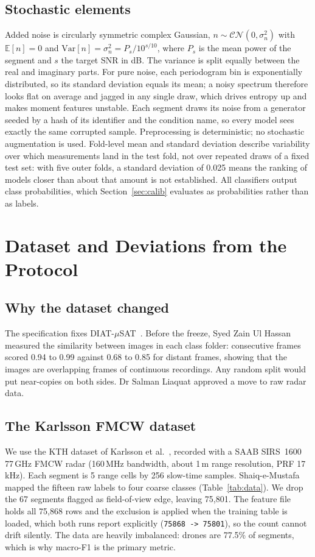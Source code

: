 \documentclass[conference]{IEEEtran}
\begin{document}
\subsection{Stochastic elements}
\label{sec:stoch}
Added noise is circularly symmetric complex Gaussian, $n \sim \mathcal{CN}(0,\sigma_n^2)$ with $\mathbb{E}[n]=0$ and $\mathrm{Var}[n]=\sigma_n^2 = P_s/10^{s/10}$, where $P_s$ is the mean power of the segment and $s$ the target SNR in dB. The variance is split equally between the real and imaginary parts. For pure noise, each periodogram bin is exponentially distributed, so its standard deviation equals its mean; a noisy spectrum therefore looks flat on average and jagged in any single draw, which drives entropy up and makes moment features unstable. Each segment draws its noise from a generator seeded by a hash of its identifier and the condition name, so every model sees exactly the same corrupted sample. Preprocessing is deterministic; no stochastic augmentation is used. Fold-level mean and standard deviation describe variability over which measurements land in the test fold, not over repeated draws of a fixed test set: with five outer folds, a standard deviation of 0.025 means the ranking of models closer than about that amount is not established. All classifiers output class probabilities, which Section~\ref{sec:calib} evaluates as probabilities rather than as labels.

\section{Dataset and Deviations from the Protocol}
\subsection{Why the dataset changed}
The specification fixes DIAT-$\mu$SAT~\cite{kumawat2022}. Before the freeze, Syed Zain Ul Hassan measured the similarity between images in each class folder: consecutive frames scored 0.94 to 0.99 against 0.68 to 0.85 for distant frames, showing that the images are overlapping frames of continuous recordings. Any random split would put near-copies on both sides. Dr Salman Liaquat approved a move to raw radar data.

\subsection{The Karlsson FMCW dataset}
We use the KTH dataset of Karlsson et al.~\cite{karlsson2022,karlsson_zenodo}, recorded with a SAAB SIRS~1600 77\,GHz FMCW radar (160\,MHz bandwidth, about 1\,m range resolution, PRF 17\,kHz). Each segment is 5 range cells by 256 slow-time samples. Shaiq-e-Mustafa mapped the fifteen raw labels to four coarse classes (Table~\ref{tab:data}). We drop the 67 segments flagged as field-of-view edge, leaving 75,801. The feature file holds all 75,868 rows and the exclusion is applied when the training table is loaded, which both runs report explicitly (\texttt{75868 -> 75801}), so the count cannot drift silently. The data are heavily imbalanced: drones are 77.5\% of segments, which is why macro-F1 is the primary metric.
\end{document}
